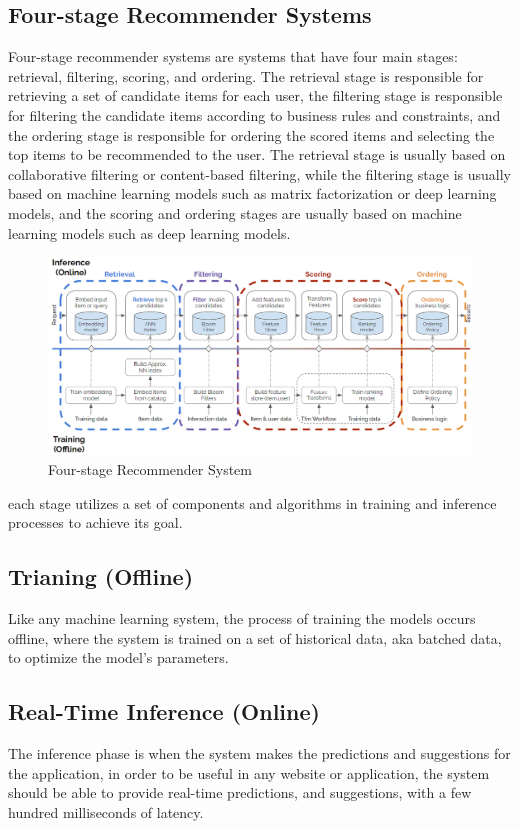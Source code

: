 \subsection*{Four-stage Recommender Systems}
Four-stage recommender systems are systems that have four main stages: retrieval, filtering, scoring, and ordering. 
The retrieval stage is responsible for retrieving a set of candidate items for each user, 
the filtering stage is responsible for filtering the candidate items according to business rules and constraints,
and the ordering stage is responsible for ordering the scored items and selecting the top items to be recommended to the user. 
The retrieval stage is usually based on collaborative filtering or content-based filtering, while the filtering stage is 
usually based on machine learning models such as matrix factorization or deep learning models, and the scoring and ordering 
stages are usually based on machine learning models such as deep learning models.\cite{NvidiaRecSysBestPractices}
\begin{figure}[H]
    \centering
    \includegraphics[width=1\textwidth]{assets/Four_stage_rec_sys.png}
    \caption{Four-stage Recommender System\cite{NvidiaRecSysBestPractices}}
\end{figure}
each stage utilizes a set of components and algorithms in training and inference processes to achieve its goal.
\subsection*{Trianing (Offline)}
Like any machine learning system, the process of training the models occurs offline,
where the system is trained on a set of historical data, aka batched data, to optimize the model's parameters.


\subsection*{Real-Time Inference (Online)}
The inference phase is when the system makes the predictions and suggestions for the application, 
in order to be useful in any website or application, 
the system should be able to provide real-time predictions, 
and suggestions, with a few hundred milliseconds of latency.

